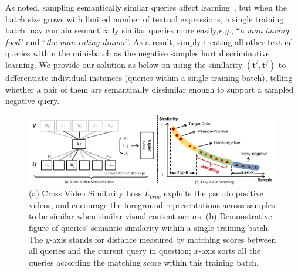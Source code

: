 As noted, sampling semantically similar queries affect learning~\citep{wu2018unsupervised}, but when the batch size grows with limited number of textual expressions, a single training batch may contain semantically similar queries more easily,\emph{e.g.}, ``\textit{a man having food}'' and ``\textit{the man eating dinner}''. 
As a result, simply treating all other textual queries within the mini-batch as the negative samples hurt discriminative learning.
We provide our solution as below on using the similarity $(\boldsymbol{t}^i, \boldsymbol{t}^j)$ to differentiate individual instances (queries within a single
training batch), telling whether a pair of them are semantically dissimilar enough
to support a sampled negative query.




\begin{figure}[t]
\includegraphics[width=.92\textwidth]{images/lcrov.pdf}
\centering
\caption[(a) Cross Video Similarity Loss $L_{crov}$ exploits the pseudo positive videos. (b) Demonstrative figure of queries' semantic similarity within a single training batch.]{\small (a) Cross Video Similarity Loss $L_{crov}$ exploits the pseudo positive videos, and encourage the foreground representations across samples to be similar when similar visual content occurs. (b) Demonstrative figure of queries' semantic similarity within a single training batch. The $y$-axis stands for distance measured by matching scores between
all queries and the current query in question;
$x$-axis sorts all the queries according the  matching score 
within this training batch.
}
\label{figure:crossvideo}
\end{figure}
 
